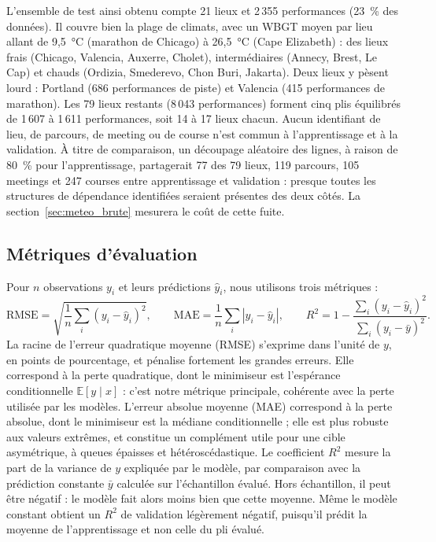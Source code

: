 \documentclass[11pt,a4paper]{article}
\newcommand{\E}{\mathbb{E}}
\begin{document}
L'ensemble de test ainsi obtenu compte 21 lieux et 2\,355 performances (23~\% des données). Il couvre bien la plage
de climats, avec un WBGT moyen par lieu allant de 9,5~°C (marathon de Chicago) à 26,5~°C (Cape Elizabeth) : des lieux
frais (Chicago, Valencia, Auxerre, Cholet), intermédiaires (Annecy, Brest, Le Cap) et chauds (Ordizia, Smederevo, Chon
Buri, Jakarta). Deux lieux y pèsent lourd : Portland (686 performances de piste) et Valencia (415 performances de
marathon). Les 79 lieux restants (8\,043 performances) forment cinq plis équilibrés de 1\,607 à 1\,611 performances,
soit 14 à 17 lieux chacun. Aucun identifiant de lieu, de parcours, de meeting ou de course n'est commun à
l'apprentissage et à la validation. À titre de comparaison, un découpage aléatoire des lignes, à raison de 80~\% pour
l'apprentissage, partagerait 77 des 79 lieux, 119 parcours, 105 meetings et 247 courses entre apprentissage et
validation : presque toutes les structures de dépendance identifiées seraient présentes des deux côtés. La
section~\ref{sec:meteo_brute} mesurera le coût de cette fuite.

\subsection{Métriques d'évaluation}\label{sec:metriques}

Pour $n$ observations $y_i$ et leurs prédictions $\hat y_i$, nous utilisons trois métriques :
\[
\mathrm{RMSE} = \sqrt{\frac1n\sum_i (y_i - \hat y_i)^2},\qquad
\mathrm{MAE} = \frac1n\sum_i |y_i - \hat y_i|,\qquad
R^2 = 1 - \frac{\sum_i (y_i - \hat y_i)^2}{\sum_i (y_i - \bar y)^2}.
\]
La racine de l'erreur quadratique moyenne (RMSE) s'exprime dans l'unité de $y$, en points de pourcentage, et pénalise
fortement les grandes erreurs. Elle correspond à la perte quadratique, dont le minimiseur est l'espérance
conditionnelle $\E[y \mid x]$ : c'est notre métrique principale, cohérente avec la perte utilisée par les modèles.
L'erreur absolue moyenne (MAE) correspond à la perte absolue, dont le minimiseur est la médiane conditionnelle ; elle
est plus robuste aux valeurs extrêmes, et constitue un complément utile pour une cible asymétrique, à queues épaisses
et hétéroscédastique. Le coefficient $R^2$ mesure la part de la variance de $y$ expliquée par le modèle, par
comparaison avec la prédiction constante $\bar y$ calculée sur l'échantillon évalué. Hors échantillon, il peut être
négatif : le modèle fait alors moins bien que cette moyenne. Même le modèle constant obtient un $R^2$ de validation
légèrement négatif, puisqu'il prédit la moyenne de l'apprentissage et non celle du pli évalué.
\end{document}
